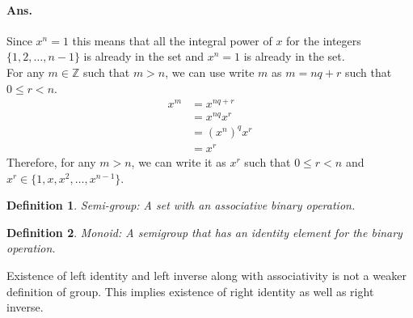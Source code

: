\documentclass[12pt]{report}
\newtheorem{defn}{Definition}
\begin{document}
\paragraph*{Ans. } Since $x^n = 1$ this means that all the integral power of $x$ for the integers $\{1,2, \dots, n-1\}$ is already in the set and $x^n = 1$ is already in the set. \\
For any $m \in \mathbb{Z}$ such that $ m > n$, we can use write $m$ as $ m = nq + r$ such that $ 0 \leq r < n$.
\begin{align*}
    x^m &= x^{nq+r}\\
    &= x^{nq} x^r\\
    &= (x^n)^q x^r\\
    &= x^r
\end{align*}
Therefore, for any $m > n$, we can write it as $x^r$ such that $ 0 \leq r < n$ and $x^r \in \{1, x, x^2, \dots, x^{n-1}\}$.
\begin{defn}
    Semi-group: A set with an associative binary operation.
\end{defn}
\begin{defn}
    Monoid: A semigroup that has an identity element for the binary operation.
\end{defn}
Existence of left identity and left inverse along with associativity is not a weaker definition of group. This implies existence of right identity as well as right inverse.
\end{document}
